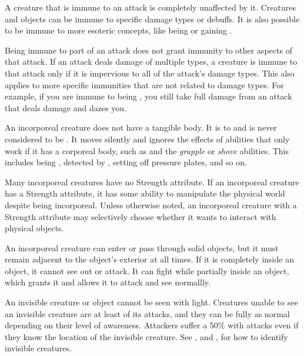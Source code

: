         A creature that is immune to an attack is completely unaffected by it.
        Creatures and objects can be immune to specific damage types or debuffs.
        It is also possible to be immune to more esoteric concepts, like being \grappled or gaining .

        Being immune to part of an attack does not grant immunity to other aspects of that attack.
        If an attack deals damage of multiple types, a creature is immune to that attack only if it is impervious to all of the attack's damage types.
        This also applies to more specific immunities that are not related to damage types.
        For example, if you are immune to being \dazed, you still take full damage from an attack that deals damage and dazes you.

        An incorporeal creature does not have a tangible body.
        It is  to  and is never considered to be \squeezing.
        It moves silently and ignores the effects of abilities that only work if it has a corporeal body, such as  and the \textit{grapple} or \textit{shove} abilities.
        This includes being \grappled, detected by , setting off pressure plates, and so on.

        Many incorporeal creatures have no Strength attribute.
        If an incorporeal creature has a Strength attribute, it has some ability to manipulate the physical world despite being incorporeal.
        Unless otherwise noted, an incorporeal creature with a Strength attribute may selectively choose whether it wants to interact with physical objects.

        An incorporeal creature can enter or pass through solid objects, but it must remain adjacent to the object's exterior at all times.
        If it is completely inside an object, it cannot see out or attack.
        It can fight while partially inside an object, which grants it  and allows it to attack and see normallly.

        An invisible creature or object cannot be seen with light.
        Creatures unable to see an invisible creature are at least \partiallyunaware of its attacks, and they can be fully \unaware as normal depending on their level of awareness.
        Attackers suffer a 50\%  with  attacks even if they know the location of the invisible creature.
        See , and , for how to identify invisible creatures.

